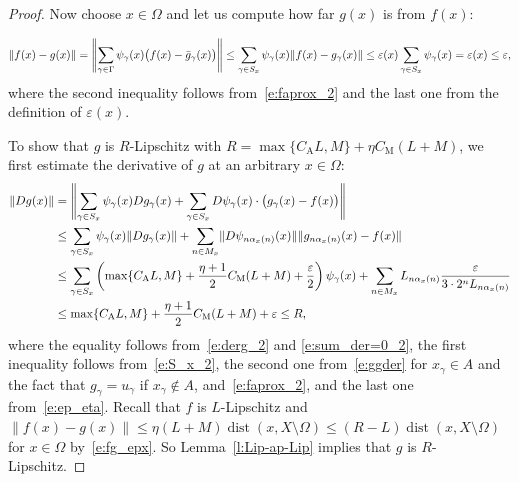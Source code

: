 \documentclass[a4paper,twoside,10pt,reqno,draft]{amsart}
\newenvironment{emshade}{%
  \snugshade
  \normalsize
}{%
  \endsnugshade
}
\theoremstyle{definition}
\theoremstyle{remark}
\newcommand\norm[1]{\mathopen\|#1\mathclose\|}
\newcommand\normb[2]{\csname#1l\endcsname\|#2\csname#1r\endcsname\|}
\newcommand\al{\alpha}
\newcommand\ga{\gamma}
\newcommand\Ga{\Gamma}
\newcommand\ve{\varepsilon}
\newcommand\Om{\Omega}
\DeclareMathOperator{\dist}{dist}
\newcommand\cCA{C_{\mathrm A}}
\newcommand\cCM{C_{\mathrm M}}
\begin{document}
\begin{proof}
Now choose $x\in\Om$ and let us compute how far $g(x)$ is from $f(x)$:
\begin{emshade}
\begin{equation}\label{e:fg_epx}
\norm{f(x)-g(x)}=\normb{Bigg}{\sum_{\ga\in\Ga}\psi_\ga(x)\bigl(f(x)-\bar g_\ga(x)\bigr)}\le\sum_{\ga\in S_x}\psi_\ga(x)\norm{f(x)-g_\ga(x)}\le\ve(x)\sum_{\ga\in S_x}\psi_\ga(x)=\ve(x)\le\ve,
\end{equation}
\end{emshade}\noindent
where the second inequality follows from~\eqref{e:faprox_2} and the last one from the definition of $\ve(x)$.

\begin{emshade}
To show that $g$ is $R$-Lipschitz with $R=\max\{\cCA L,M\}+\eta\cCM(L+M)$, we first estimate the derivative of $g$ at an arbitrary $x\in\Om$:
\[\begin{split}
\norm{Dg(x)}&=\normb{Bigg}{\sum_{\ga\in S_x}\psi_\ga(x)Dg_\ga(x)+\sum_{\ga\in S_x}D\psi_\ga(x)\cdot\bigl(g_\ga(x)-f(x)\bigr)}\\
&\le\sum_{\ga\in S_x}\psi_\ga(x)\norm{Dg_\ga(x)}+\sum_{n\in M_x}\norm{D\psi_{n\al_x(n)}(x)}\norm{g_{n\al_x(n)}(x)-f(x)}\\
&\le\sum_{\ga\in S_x}\left(\max\{\cCA L,M\}+\frac{\eta+1}2\cCM(L+M)+\frac\ve2\right)\psi_\ga(x)+\sum_{n\in M_x}L_{n\al_x(n)}\frac\ve{3\cdot2^nL_{n\al_x(n)}}\\
&\le\max\{\cCA L,M\}+\frac{\eta+1}2\cCM(L+M)+\ve\le R,
\end{split}\]
where the equality follows from~\eqref{e:derg_2} and \eqref{e:sum_der=0_2},
the first inequality follows from~\eqref{e:S_x_2}, the second one from~\eqref{e:ggder} for $x_\ga\in A$ and the fact that $g_\ga=u_\ga$ if $x_\ga\notin A$, and~\eqref{e:faprox_2}, and the last one from~\eqref{e:ep_eta}.
Recall that $f$ is $L$-Lipschitz and $\norm{f(x)-g(x)}\le\eta(L+M)\dist(x,X\setminus\Om)\le(R-L)\dist(x,X\setminus\Om)$ for $x\in\Om$ by~\eqref{e:fg_epx}.
So Lemma~\ref{l:Lip-ap-Lip} implies that $g$ is $R$-Lipschitz.
\end{emshade}


\end{proof}
\end{document}
